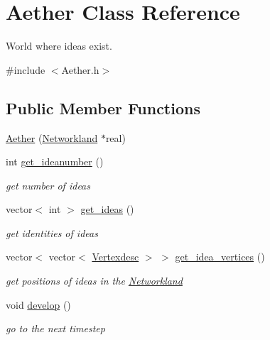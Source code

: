 \hypertarget{classAether}{}\section{Aether Class Reference}
\label{classAether}


World where ideas exist.  




{\ttfamily \#include $<$Aether.\+h$>$}

\subsection*{Public Member Functions}
\begin{DoxyCompactItemize}
\item 
\hyperlink{classAether_adb65b2b9dec23ddd4b29c2cbe364b764}{Aether} (\hyperlink{classNetworkland}{Networkland} $\ast$real)
\item 
int \hyperlink{classAether_a7c03f99d5a7ae5b866b8fdabeab890aa}{get\+\_\+ideanumber} ()
\begin{DoxyCompactList}\small\item\em get number of ideas \end{DoxyCompactList}\item 
vector$<$ int $>$ \hyperlink{classAether_a9ca2639bc95e00c78849775f578ea088}{get\+\_\+ideas} ()
\begin{DoxyCompactList}\small\item\em get identities of ideas \end{DoxyCompactList}\item 
vector$<$ vector$<$ \hyperlink{Networkland_8h_af340ced64bd0b6914662d1b26be70b41}{Vertexdesc} $>$ $>$ \hyperlink{classAether_a4203453890988736ebce82be4f51a965}{get\+\_\+idea\+\_\+vertices} ()
\begin{DoxyCompactList}\small\item\em get positions of ideas in the \hyperlink{classNetworkland}{Networkland} \end{DoxyCompactList}\item 
void \hyperlink{classAether_aa26ea89dc9dc145479f8c2065121e76d}{develop} ()
\begin{DoxyCompactList}\small\item\em go to the next timestep \end{DoxyCompactList}\end{DoxyCompactItemize}
